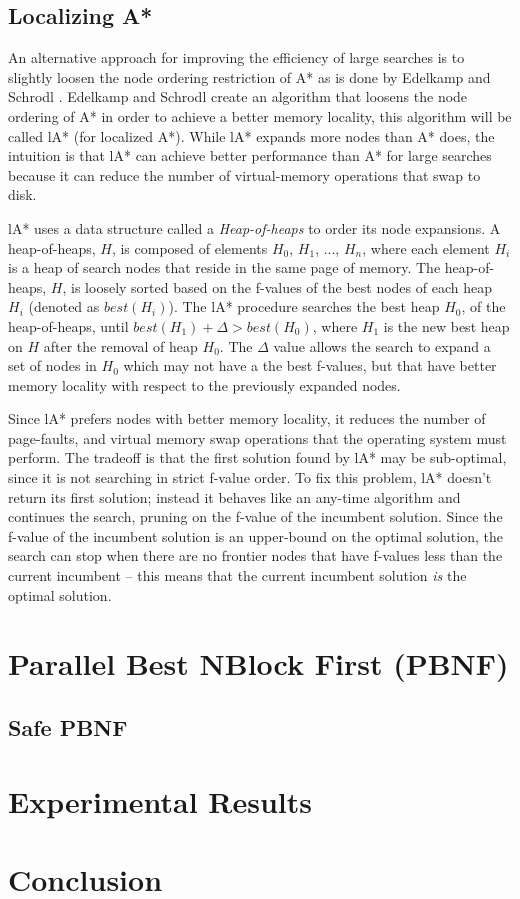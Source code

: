 \documentclass{article} \usepackage{aaai} \usepackage{graphicx}
\begin{document}
\subsection{Localizing A*}

An alternative approach for improving the efficiency of large searches
is to slightly loosen the node ordering restriction of A* as is done
by Edelkamp and Schrodl \cite{edelkamp:loc}.  Edelkamp and Schrodl
create an algorithm that loosens the node ordering of A* in order to
achieve a better memory locality, this algorithm will be called lA*
(for localized A*).  While lA* expands more nodes than A* does, the
intuition is that lA* can achieve better performance than A* for large
searches because it can reduce the number of virtual-memory operations
that swap to disk.

lA* uses a data structure called a \emph{Heap-of-heaps} to order its
node expansions.  A heap-of-heaps, $H$, is composed of elements $H_0$,
$H_1$, ..., $H_n$, where each element $H_i$ is a heap of search nodes
that reside in the same page of memory.  The heap-of-heaps, $H$, is
loosely sorted based on the f-values of the best nodes of each heap
$H_i$ (denoted as $best(H_i)$).  The lA* procedure searches the best
heap $H_0$, of the heap-of-heaps, until $best(H_1) + \Delta >
best(H_0)$, where $H_1$ is the new best heap on $H$ after the removal
of heap $H_0$.  The $\Delta$ value allows the search to expand a set
of nodes in $H_0$ which may not have a the best f-values, but that
have better memory locality with respect to the previously expanded
nodes.

Since lA* prefers nodes with better memory locality, it reduces the
number of page-faults, and virtual memory swap operations that the
operating system must perform.  The tradeoff is that the first
solution found by lA* may be sub-optimal, since it is not searching in
strict f-value order.  To fix this problem, lA* doesn't return its
first solution; instead it behaves like an any-time algorithm and
continues the search, pruning on the f-value of the incumbent
solution.  Since the f-value of the incumbent solution is an
upper-bound on the optimal solution, the search can stop when there
are no frontier nodes that have f-values less than the current
incumbent -- this means that the current incumbent solution \emph{is}
the optimal solution.

\section{Parallel Best NBlock First (PBNF)}
\subsection{Safe PBNF}
\section{Experimental Results}
\section{Conclusion}



\end{document}

